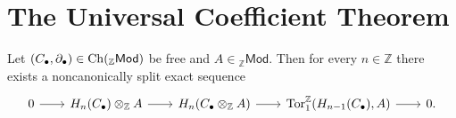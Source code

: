 \section*{The Universal Coefficient Theorem}

\begin{theorem}
	Let $(C_\bullet,\partial_\bullet) \in \operatorname{Ch}({_\mathbb{Z}}\mathsf{Mod})$ be free and $A \in {_\mathbb{Z}}\mathsf{Mod}$. Then for every $n \in \mathbb{Z}$ there exists a noncanonically split exact sequence
	\begin{equation*}
		\begin{tikzcd}[column sep = 2em]
			0 \arrow[r] & H_n(C_\bullet) \otimes_\mathbb{Z} A \arrow[r] & H_n(C_\bullet \otimes_\mathbb{Z} A) \arrow[r] & \Tor^\mathbb{Z}_1(H_{n - 1}(C_\bullet),A) \arrow[r] & 0.
		\end{tikzcd}
	\end{equation*}
\end{theorem}

